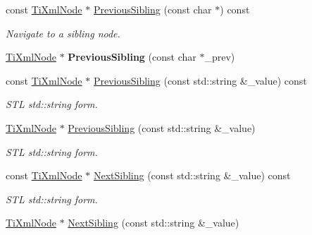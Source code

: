 \begin{DoxyCompactItemize}
\item 
\hypertarget{class_ti_xml_node_a5bdd49327eec1e609b7d22af706b8316}{
const \hyperlink{class_ti_xml_node}{TiXmlNode} $\ast$ \hyperlink{class_ti_xml_node_a5bdd49327eec1e609b7d22af706b8316}{PreviousSibling} (const char $\ast$) const }
\label{class_ti_xml_node_a5bdd49327eec1e609b7d22af706b8316}

\begin{DoxyCompactList}\small\item\em Navigate to a sibling node. \item\end{DoxyCompactList}\item 
\hypertarget{class_ti_xml_node_a6c977049207177ef21b51972315c2053}{
\hyperlink{class_ti_xml_node}{TiXmlNode} $\ast$ {\bfseries PreviousSibling} (const char $\ast$\_\-prev)}
\label{class_ti_xml_node_a6c977049207177ef21b51972315c2053}

\item 
\hypertarget{class_ti_xml_node_a658276f57d35d5d4256d1dc1a2c398ab}{
const \hyperlink{class_ti_xml_node}{TiXmlNode} $\ast$ \hyperlink{class_ti_xml_node_a658276f57d35d5d4256d1dc1a2c398ab}{PreviousSibling} (const std::string \&\_\-value) const }
\label{class_ti_xml_node_a658276f57d35d5d4256d1dc1a2c398ab}

\begin{DoxyCompactList}\small\item\em STL std::string form. \item\end{DoxyCompactList}\item 
\hypertarget{class_ti_xml_node_acc8a0434c7f401d4a3b6dee77c1a5912}{
\hyperlink{class_ti_xml_node}{TiXmlNode} $\ast$ \hyperlink{class_ti_xml_node_acc8a0434c7f401d4a3b6dee77c1a5912}{PreviousSibling} (const std::string \&\_\-value)}
\label{class_ti_xml_node_acc8a0434c7f401d4a3b6dee77c1a5912}

\begin{DoxyCompactList}\small\item\em STL std::string form. \item\end{DoxyCompactList}\item 
\hypertarget{class_ti_xml_node_a1b94d2f7fa7ab25a5a8e8d4340c449c9}{
const \hyperlink{class_ti_xml_node}{TiXmlNode} $\ast$ \hyperlink{class_ti_xml_node_a1b94d2f7fa7ab25a5a8e8d4340c449c9}{NextSibling} (const std::string \&\_\-value) const }
\label{class_ti_xml_node_a1b94d2f7fa7ab25a5a8e8d4340c449c9}

\begin{DoxyCompactList}\small\item\em STL std::string form. \item\end{DoxyCompactList}\item 
\hypertarget{class_ti_xml_node_a1757c1f4d01e8c9596ffdbd561c76aea}{
\hyperlink{class_ti_xml_node}{TiXmlNode} $\ast$ \hyperlink{class_ti_xml_node_a1757c1f4d01e8c9596ffdbd561c76aea}{NextSibling} (const std::string \&\_\-value)}
\label{class_ti_xml_node_a1757c1f4d01e8c9596ffdbd561c76aea}


\end{DoxyCompactItemize}
